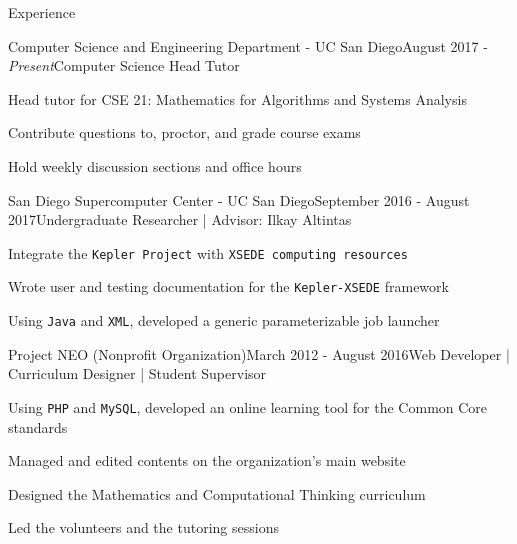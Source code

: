 \documentclass{resume} %
\begin{document}
\begin{rSection}{Experience}

\begin{rSubsection}{Computer Science and Engineering Department - UC San Diego}{August 2017 - \textit{Present}}{Computer Science Head Tutor}{}
\item Head tutor for CSE 21: Mathematics for Algorithms and Systems Analysis
\item Contribute questions to, proctor, and grade course exams
\item Hold weekly discussion sections and office hours
\end{rSubsection}


\begin{rSubsection}{San Diego Supercomputer Center - UC San Diego}{September 2016 - August 2017}{Undergraduate Researcher | Advisor: Ilkay Altintas}{}
\item Integrate the \texttt{Kepler Project} with \texttt{XSEDE computing resources} 
\item Wrote user and testing documentation for the \texttt{Kepler-XSEDE} framework
\item Using \texttt{Java} and \texttt{XML}, developed a generic parameterizable job launcher
\end{rSubsection}


\begin{rSubsection}{Project NEO (Nonprofit Organization)}{March 2012 - August 2016}{Web Developer | Curriculum Designer | Student Supervisor}{}
\item Using \texttt{PHP} and \texttt{MySQL}, developed an online learning tool for the Common Core standards
\item Managed and edited contents on the organization's main website
\item Designed the Mathematics and Computational Thinking curriculum
\item Led the volunteers and the tutoring sessions
\end{rSubsection}

\end{rSection}

\end{document}
